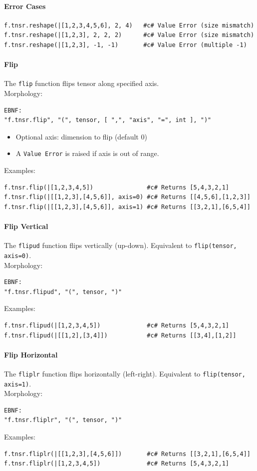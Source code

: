 \paragraph{Error Cases}
\begin{verbatim}
f.tnsr.reshape(|[1,2,3,4,5,6], 2, 4)   #c# Value Error (size mismatch)
f.tnsr.reshape(|[1,2,3], 2, 2, 2)      #c# Value Error (size mismatch)
f.tnsr.reshape(|[1,2,3], -1, -1)       #c# Value Error (multiple -1)
\end{verbatim}

\paragraph{Flip}
The \texttt{flip} function flips tensor along specified axis.\\
Morphology:
\begin{verbatim}
EBNF:
"f.tnsr.flip", "(", tensor, [ ",", "axis", "=", int ], ")"
\end{verbatim}
\begin{itemize}
\item Optional axis: dimension to flip (default 0)
\item A \texttt{Value Error} is raised if axis is out of range.
\end{itemize}
Examples:
\begin{verbatim}
f.tnsr.flip(|[1,2,3,4,5])               #c# Returns [5,4,3,2,1]
f.tnsr.flip(|[[1,2,3],[4,5,6]], axis=0) #c# Returns [[4,5,6],[1,2,3]]
f.tnsr.flip(|[[1,2,3],[4,5,6]], axis=1) #c# Returns [[3,2,1],[6,5,4]]
\end{verbatim}

\paragraph{Flip Vertical}
The \texttt{flipud} function flips vertically (up-down). Equivalent to \texttt{flip(tensor, axis=0)}.\\
Morphology:
\begin{verbatim}
EBNF:
"f.tnsr.flipud", "(", tensor, ")"
\end{verbatim}
Examples:
\begin{verbatim}
f.tnsr.flipud(|[1,2,3,4,5])             #c# Returns [5,4,3,2,1]
f.tnsr.flipud(|[[1,2],[3,4]])           #c# Returns [[3,4],[1,2]]
\end{verbatim}

\paragraph{Flip Horizontal}
The \texttt{fliplr} function flips horizontally (left-right). Equivalent to \texttt{flip(tensor, axis=1)}.\\
Morphology:
\begin{verbatim}
EBNF:
"f.tnsr.fliplr", "(", tensor, ")"
\end{verbatim}
Examples:
\begin{verbatim}
f.tnsr.fliplr(|[[1,2,3],[4,5,6]])       #c# Returns [[3,2,1],[6,5,4]]
f.tnsr.fliplr(|[1,2,3,4,5])             #c# Returns [5,4,3,2,1]
\end{verbatim}

